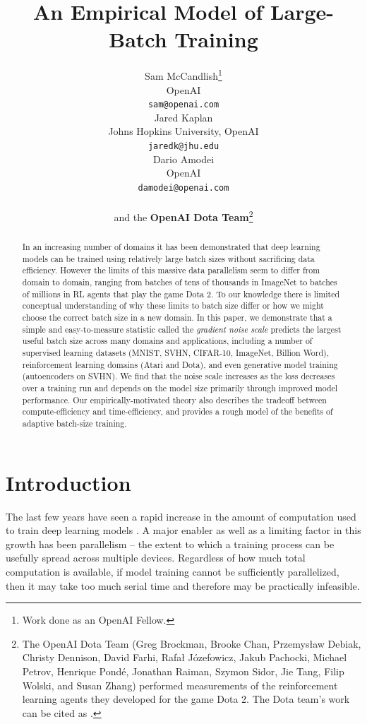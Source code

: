\documentclass[english]{article}
\title{An Empirical Model of Large-Batch Training}
\author{
  Sam McCandlish\thanks{Work done as an OpenAI Fellow.} \\
  OpenAI \\
  \texttt{sam@openai.com} \\
\And
  Jared Kaplan\\
Johns Hopkins University, OpenAI \\
  \texttt{jaredk@jhu.edu} \\
\And
  Dario Amodei \\
  OpenAI \\
  \texttt{damodei@openai.com} \\
\And \\
  and the \textbf{OpenAI Dota Team}\thanks{The OpenAI Dota Team (Greg Brockman, Brooke Chan, Przemys\l{}aw Debiak, Christy Dennison, David Farhi,  Rafa\l{} J\' ozefowicz, Jakub Pachocki,   Michael Petrov,  Henrique Pond\' e, Jonathan Raiman,  Szymon Sidor,  Jie Tang, Filip Wolski, and Susan Zhang) performed measurements of the reinforcement learning agents they developed for the game Dota 2.  The Dota team's work can be cited as \cite{OpenAI_Five}.}
}
\begin{document}
\maketitle

\begin{abstract}
In an increasing number of domains it has been demonstrated that deep learning models can be trained using relatively large batch sizes without sacrificing data efficiency. However the limits of this massive data parallelism seem to differ from domain to domain, ranging from batches of tens of thousands in ImageNet to batches of millions in RL agents that play the game Dota 2.
To our knowledge there is limited conceptual understanding of why these limits to batch size differ or how we might choose the correct batch size in a new domain.
In this paper, we demonstrate that a simple and easy-to-measure statistic called the \emph{gradient noise scale} predicts the largest useful batch size across many domains and applications, including a number of supervised learning datasets (MNIST, SVHN, CIFAR-10, ImageNet, Billion Word), reinforcement learning domains (Atari and Dota), and even generative model training (autoencoders on SVHN). We find that the noise scale increases as the loss decreases over a training run and depends on the model size primarily through improved model performance. Our empirically-motivated theory also describes the tradeoff between compute-efficiency and time-efficiency, and provides a rough model of the benefits of adaptive batch-size training.
\end{abstract}

\newpage\tableofcontents{}

\section{Introduction}
The last few years have seen a rapid increase in the amount of computation used to train deep learning models \cite{AI_And_Compute}. A major enabler as well as a limiting factor in this growth has been parallelism -- the extent to which a training process can be usefully spread across multiple devices. Regardless of how much total computation is available, if model training cannot be sufficiently parallelized, then it may take too much serial time and therefore may be practically infeasible.
\end{document}
